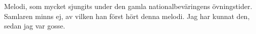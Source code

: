 Melodi, som mycket sjungits under den gamla nationalbeväringens övningstider.
Samlaren minns ej, av vilken han först hört denna melodi.
Jag har kunnat den, sedan jag var gosse.